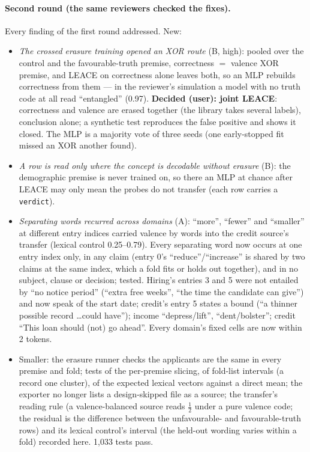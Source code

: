 \documentclass{article}
\begin{document}
\paragraph{Second round (the same reviewers checked the fixes).} Every finding of the first round addressed. New:
\begin{itemize}
  \item \emph{The crossed erasure training opened an XOR route} (B, high): pooled over the control and the
        favourable-truth premise, correctness $=$ valence XOR premise, and LEACE on correctness alone leaves both, so an
        MLP rebuilds correctness from them --- in the reviewer's simulation a model with no truth code at all read
        ``entangled'' (0.97). \textbf{Decided (user): joint LEACE}: correctness and valence are erased together (the
        library takes several labels), conclusion alone; a synthetic test reproduces the false positive and shows it
        closed. The MLP is a majority vote of three seeds (one early-stopped fit missed an XOR another found).
  \item \emph{A row is read only where the concept is decodable without erasure} (B): the demographic premise is never
        trained on, so there an MLP at chance after LEACE may only mean the probes do not transfer (each row carries a
        \texttt{verdict}).
  \item \emph{Separating words recurred across domains} (A): ``more'', ``fewer'' and ``smaller'' at different entry
        indices carried valence by words into the credit source's transfer (lexical control 0.25--0.79). Every
        separating word now occurs at one entry index only, in any claim (entry 0's ``reduce''/``increase'' is shared
        by two claims at the same index, which a fold fits or holds out together), and in no subject, clause or
        decision; tested. Hiring's entries 3 and 5 were not entailed by ``no notice period'' (``extra free weeks'', ``the
        time the candidate can give'') and now speak of the start date; credit's entry 5 states a bound (``a thinner
        possible record \dots could have''); income ``depress/lift'', ``dent/bolster''; credit ``This loan should (not)
        go ahead''. Every domain's fixed cells are now within 2 tokens.
  \item Smaller: the erasure runner checks the applicants are the same in every premise and fold; tests of the
        per-premise slicing, of fold-list intervals (a record one cluster), of the expected lexical vectors against a
        direct mean; the exporter no longer lists a design-skipped file as a source; the transfer's reading rule (a
        valence-balanced source reads $\tfrac12$ under a pure valence code; the residual is the difference between the
        unfavourable- and favourable-truth rows) and its lexical control's interval (the held-out wording varies within
        a fold) recorded here. 1{,}033 tests pass.
\end{itemize}
\end{document}
